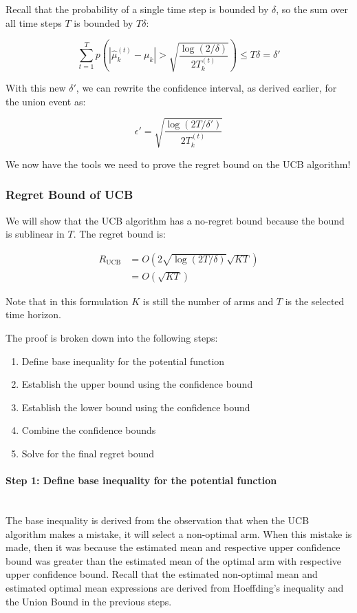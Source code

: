 \documentclass[11pt]{article}
\begin{document}
Recall that the probability of a single time step is bounded by $\delta$, so the sum over all time steps $T$ is bounded by $T\delta$:

\begin{equation}
    \sum_{t=1}^T p(|\hat{\mu}_k^{(t)} - \mu_k| > \sqrt{\frac{\log(2/\delta)}{2T_k^{(t)}}}) \leq T\delta = \delta'
\end{equation}

With this new $\delta'$, we can rewrite the confidence interval, as derived earlier, for the union event as:

\begin{equation}
    \epsilon' = \sqrt{\frac{\log(2T/\delta')}{2T_k^{(t)}}}
\end{equation}

We now have the tools we need to prove the regret bound on the UCB algorithm!

\subsubsection{Regret Bound of UCB}

We will show that the UCB algorithm has a no-regret bound because the bound is sublinear in $T$. The regret bound is:

\begin{align}
    R_{\text{UCB}} &= O(2\sqrt{\log(2T/\delta)}\sqrt{KT}) \\
    &= O(\sqrt{KT})
\end{align}

Note that in this formulation $K$ is still the number of arms and $T$ is the selected time horizon.

The proof is broken down into the following steps:

\begin{enumerate}
    \item Define base inequality for the potential function
    \item Establish the upper bound using the confidence bound
    \item Establish the lower bound using the confidence bound
    \item Combine the confidence bounds
    \item Solve for the final regret bound
\end{enumerate}

\paragraph{Step 1: Define base inequality for the potential function}
\noindent \\
The base inequality is derived from the observation that when the UCB algorithm makes a mistake, it will select a non-optimal arm. When this mistake is made, then it was because the estimated mean and respective upper confidence bound was greater than the estimated mean of the optimal arm with respective upper confidence bound. Recall that the estimated non-optimal mean and estimated optimal mean expressions are derived from Hoeffding's inequality and the Union Bound in the previous steps. 
\end{document}

